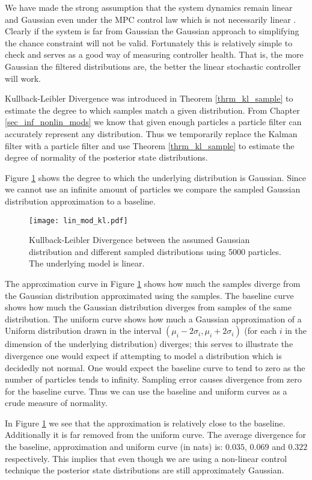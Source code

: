 We have made the strong assumption that the system dynamics remain linear and Gaussian even under the MPC control law which is not necessarily linear \cite{mac}. Clearly if the system is far from Gaussian the Gaussian approach to simplifying the chance constraint will not be valid. Fortunately this is relatively simple to check and serves as a good way of measuring controller health. That is, the more Gaussian the filtered distributions are, the better the linear stochastic controller will work. 

Kullback-Leibler Divergence was introduced in Theorem \ref{thrm_kl_sample} to estimate the degree to which samples match a given distribution. From Chapter \ref{sec_inf_nonlin_mods} we know that given enough particles a particle filter can accurately represent any distribution. Thus we temporarily replace the Kalman filter with a particle filter and use Theorem \ref{thrm_kl_sample} to estimate the degree of normality of the posterior state distributions.

Figure \ref{fig_lin_mod_kl} shows the degree to which the underlying distribution is Gaussian. Since we cannot use an infinite amount of particles we compare the sampled Gaussian distribution approximation to a baseline.   
\begin{figure}[H] 
\centering
\texttt{[image: lin\_mod\_kl.pdf]}
\caption{Kullback-Leibler Divergence between the assumed Gaussian distribution and different sampled distributions using 5000 particles. The underlying model is linear.}
\label{fig_lin_mod_kl}
\end{figure}
The approximation curve in Figure \ref{fig_lin_mod_kl} shows how much the samples diverge from the Gaussian distribution approximated using the samples. The baseline curve shows how much the Gaussian distribution diverges from samples of the same distribution. The uniform curve shows how much a Gaussian approximation of a Uniform distribution drawn in the interval $(\mu_i-2\sigma_i, \mu_i+2\sigma_i)$ (for each $i$ in the dimension of the underlying distribution) diverges; this serves to illustrate the divergence one would expect if attempting to model a distribution which is decidedly not normal. One would expect the baseline curve to tend to zero as the number of particles tends to infinity. Sampling error causes divergence from zero for the baseline curve. Thus we can use the baseline and uniform curves as a crude measure of normality.

In Figure \ref{fig_lin_mod_kl} we see that the approximation is relatively close to the baseline. Additionally it is far removed from the uniform curve. The average divergence for the baseline, approximation and uniform curve (in nats) is: $0.035$, $0.069$ and $0.322$ respectively. This implies that even though we are using a non-linear control technique the posterior state distributions are still approximately Gaussian. 

